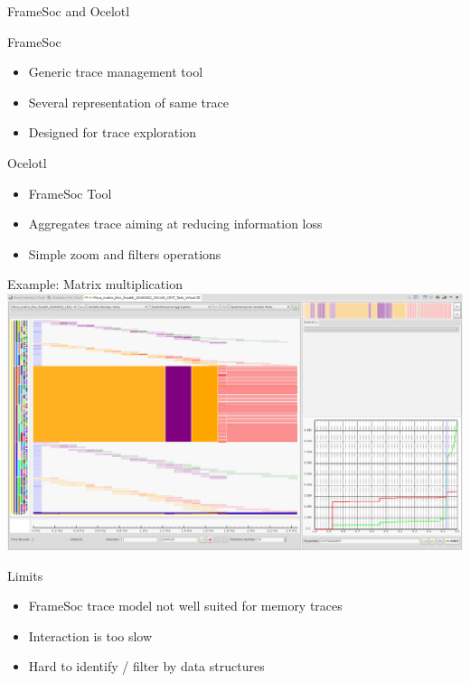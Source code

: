 \documentclass[xcolor={usenames,dvipsnames},hyperref={pdfusetitle}]{beamer}
\begin{document}
\begin{frame}{FrameSoc and Ocelotl}
    \begin{block}{FrameSoc~\cite{Pagano14frameSoC}}
        \begin{itemize}
            \item Generic trace management tool
            \item Several representation of same trace
            \item Designed for trace exploration
        \end{itemize}
    \end{block}
    \pause
    \begin{alertblock}{Ocelotl~\cite{Dosimont14Ocelotl}}
        \begin{itemize}
            \item FrameSoc Tool
            \item Aggregates trace aiming at reducing information loss
            \item Simple zoom and filters operations
        \end{itemize}
    \end{alertblock}
\end{frame}

\begin{frame}{Example: Matrix multiplication}
    \centering
    \includegraphics[width=\linewidth]{ocelotl/overview.png}
\end{frame}

\begin{frame}{Limits}
    \begin{itemize}
        \item FrameSoc trace model not well suited for memory traces
        \item Interaction is too slow
        \item Hard to identify / filter by data structures
    \end{itemize}
\end{frame}
\end{document}
